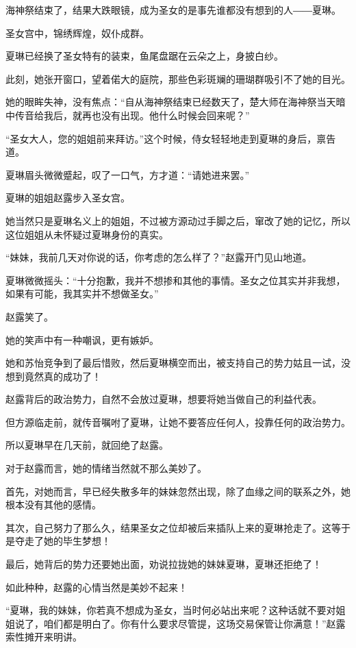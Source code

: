 
\begin{this_body}

海神祭结束了，结果大跌眼镜，成为圣女的是事先谁都没有想到的人――夏琳。

圣女宫中，锦绣辉煌，奴仆成群。

夏琳已经换了圣女特有的装束，鱼尾盘踞在云朵之上，身披白纱。

此刻，她张开窗口，望着偌大的庭院，那些色彩斑斓的珊瑚群吸引不了她的目光。

她的眼眸失神，没有焦点：“自从海神祭结束已经数天了，楚大师在海神祭当天暗中传音给我后，就再也没有出现。他什么时候会回来呢？”

“圣女大人，您的姐姐前来拜访。”这个时候，侍女轻轻地走到夏琳的身后，禀告道。

夏琳眉头微微蹙起，叹了一口气，方才道：“请她进来罢。”

夏琳的姐姐赵露步入圣女宫。

她当然只是夏琳名义上的姐姐，不过被方源动过手脚之后，窜改了她的记忆，所以这位姐姐从未怀疑过夏琳身份的真实。

“妹妹，我前几天对你说的话，你考虑的怎么样了？”赵露开门见山地道。

夏琳微微摇头：“十分抱歉，我并不想掺和其他的事情。圣女之位其实并非我想，如果有可能，我其实并不想做圣女。”

赵露笑了。

她的笑声中有一种嘲讽，更有嫉妒。

她和苏怡竞争到了最后惜败，然后夏琳横空而出，被支持自己的势力姑且一试，没想到竟然真的成功了！

赵露背后的政治势力，自然不会放过夏琳，想要将她当做自己的利益代表。

但方源临走前，就传音嘱咐了夏琳，让她不要答应任何人，投靠任何的政治势力。

所以夏琳早在几天前，就回绝了赵露。

对于赵露而言，她的情绪当然就不那么美妙了。

首先，对她而言，早已经失散多年的妹妹忽然出现，除了血缘之间的联系之外，她根本没有其他的感情。

其次，自己努力了那么久，结果圣女之位却被后来插队上来的夏琳抢走了。这等于是夺走了她的毕生梦想！

最后，她背后的势力还要她出面，劝说拉拢她的妹妹夏琳，夏琳还拒绝了！

如此种种，赵露的心情当然是美妙不起来！

“夏琳，我的妹妹，你若真不想成为圣女，当时何必站出来呢？这种话就不要对姐姐说了，咱们都是明白了。你有什么要求尽管提，这场交易保管让你满意！”赵露索性摊开来明讲。


\end{this_body}
